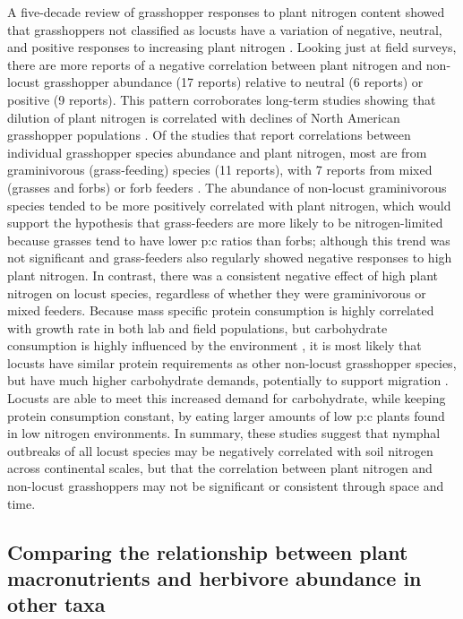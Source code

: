 \documentclass[
]{article}
\begin{document}
A five-decade review of grasshopper responses to plant nitrogen content
showed that grasshoppers not classified as locusts have a variation of
negative, neutral, and positive responses to increasing plant nitrogen
\citep{cease_how_2024}. Looking just at field surveys, there are more
reports of a negative correlation between plant nitrogen and non-locust
grasshopper abundance (17 reports) relative to neutral (6 reports) or
positive (9 reports). This pattern corroborates long-term studies
showing that dilution of plant nitrogen is correlated with declines of
North American grasshopper populations \citep{welti_nutrient_2020}. Of
the studies that report correlations between individual grasshopper
species abundance and plant nitrogen, most are from graminivorous
(grass-feeding) species (11 reports), with 7 reports from mixed (grasses
and forbs) or forb feeders \citep{cease_how_2024}. The abundance of
non-locust graminivorous species tended to be more positively correlated
with plant nitrogen, which would support the hypothesis that
grass-feeders are more likely to be nitrogen-limited because grasses
tend to have lower p:c ratios than forbs; although this trend was not
significant and grass-feeders also regularly showed negative responses
to high plant nitrogen. In contrast, there was a consistent negative
effect of high plant nitrogen on locust species, regardless of whether
they were graminivorous or mixed feeders. Because mass specific protein
consumption is highly correlated with growth rate in both lab and field
populations, but carbohydrate consumption is highly influenced by the
environment \citep{talal_body_2023}, it is most likely that locusts have
similar protein requirements as other non-locust grasshopper species,
but have much higher carbohydrate demands, potentially to support
migration
\citep{raubenheimer_integrative_1997, talal_high_2021, talal_body_2023}.
Locusts are able to meet this increased demand for carbohydrate, while
keeping protein consumption constant, by eating larger amounts of low
p:c plants found in low nitrogen environments. In summary, these studies
suggest that nymphal outbreaks of all locust species may be negatively
correlated with soil nitrogen across continental scales, but that the
correlation between plant nitrogen and non-locust grasshoppers may not
be significant or consistent through space and time.

\subsection{Comparing the relationship between plant macronutrients and
herbivore abundance in other
taxa}\label{comparing-the-relationship-between-plant-macronutrients-and-herbivore-abundance-in-other-taxa}
\end{document}
